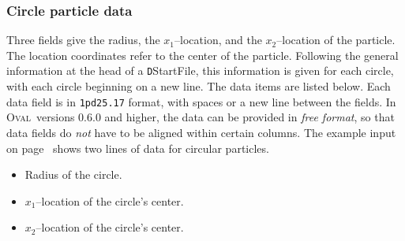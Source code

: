 \documentclass[letterpaper,11pt]{article}
\newcommand{\Oval}{\textsc{Oval}}
\begin{document}
\subsubsection{Circle particle data}\label{sec:circle_data}
Three fields give the radius,
the $x_{1}$--location, and the $x_{2}$--location of the particle.
The location coordinates refer to the center of the particle.
Following the general information at the head of a
\texttt{D}\textsf{StartFile}, this
information is given for each circle,
with each circle beginning on a new line.
The data items are listed below.
Each data field is in \texttt{1pd25.17} format, with
spaces or a new line between the fields.
In \Oval\ versions 0.6.0 and higher, 
the data can be provided in \emph{free format},
so that data fields do \emph{not} have to be aligned 
within certain columns.
The example input on page~\pageref{page:dfile}
shows two lines of data for circular particles.
\begin{itemize}
\item
Radius of the circle.
\item
$x_{1}$--location of the circle's center.
\item
$x_{2}$--location of the circle's center.
\end{itemize}
\end{document}
